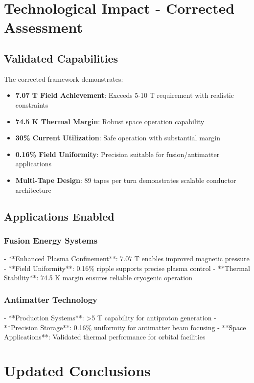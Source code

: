 \section{Technological Impact - Corrected Assessment}

\subsection{Validated Capabilities}

The corrected framework demonstrates:
\begin{itemize}
\item \textbf{7.07 T Field Achievement}: Exceeds 5-10 T requirement with realistic constraints
\item \textbf{74.5 K Thermal Margin}: Robust space operation capability
\item \textbf{30\% Current Utilization}: Safe operation with substantial margin
\item \textbf{0.16\% Field Uniformity}: Precision suitable for fusion/antimatter applications
\item \textbf{Multi-Tape Design}: 89 tapes per turn demonstrates scalable conductor architecture
\end{itemize}

\subsection{Applications Enabled}

\subsubsection{Fusion Energy Systems}
- **Enhanced Plasma Confinement**: 7.07 T enables improved magnetic pressure
- **Field Uniformity**: 0.16\% ripple supports precise plasma control
- **Thermal Stability**: 74.5 K margin ensures reliable cryogenic operation

\subsubsection{Antimatter Technology}
- **Production Systems**: >5 T capability for antiproton generation
- **Precision Storage**: 0.16\% uniformity for antimatter beam focusing
- **Space Applications**: Validated thermal performance for orbital facilities

\section{Updated Conclusions}

